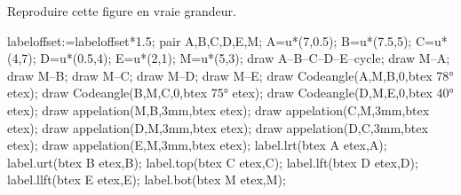 
\begin{exercice*}
    Reproduire cette figure en vraie grandeur.

    \begin{Geometrie}
        labeloffset:=labeloffset*1.5;
        pair A,B,C,D,E,M;
        A=u*(7,0.5);
        B=u*(7.5,5);
        C=u*(4,7);
        D=u*(0.5,4);
        E=u*(2,1);
        M=u*(5,3);
        draw A--B--C--D--E--cycle;
        draw M--A;
        draw M--B;
        draw M--C;
        draw M--D;
        draw M--E;
        draw Codeangle(A,M,B,0,btex \ang{78} etex);
        draw Codeangle(B,M,C,0,btex \ang{75} etex);
        draw Codeangle(D,M,E,0,btex \ang{40} etex);
        draw appelation(M,B,3mm,btex  etex);
        draw appelation(C,M,3mm,btex  etex);
        draw appelation(D,M,3mm,btex  etex);
        draw appelation(D,C,3mm,btex  etex);
        draw appelation(E,M,3mm,btex  etex);
        label.lrt(btex A etex,A);
        label.urt(btex B etex,B);
        label.top(btex C etex,C);
        label.lft(btex D etex,D);
        label.llft(btex E etex,E);
        label.bot(btex M etex,M);
    \end{Geometrie}
\end{exercice*}